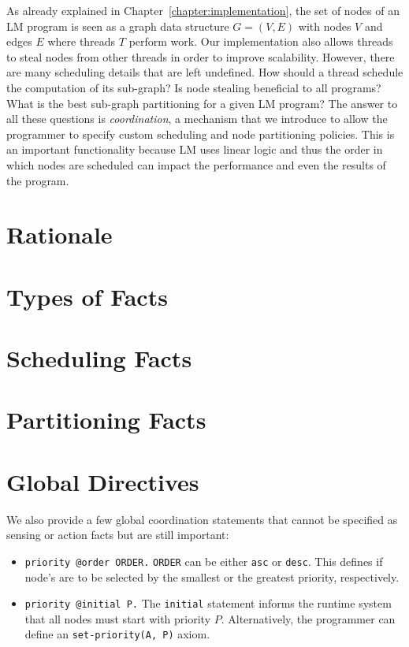 As already explained in Chapter~\ref{chapter:implementation}, the set of nodes
of an LM program is seen as a graph data structure $G = (V, E)$ with nodes $V$
and edges $E$ where threads $T$ perform work. Our implementation also allows
threads to steal nodes from other threads in order to improve scalability.
However, there are many scheduling details that are left undefined. How should a
thread schedule the computation of its sub-graph? Is node stealing beneficial to
all programs? What is the best sub-graph partitioning for a given LM program?
The answer to all these questions is \emph{coordination}, a mechanism that we
introduce to allow the programmer to specify custom scheduling and node
partitioning policies. This is an important functionality because LM uses linear
logic and thus the order in which nodes are scheduled can impact the performance
and even the results of the program.

\section{Rationale}



\section{Types of Facts}



\section{Scheduling Facts}\label{sec:fifo}



\section{Partitioning Facts}


\section{Global Directives}

We also provide a few global coordination statements that cannot be specified
as sensing or action facts but are still important:

\begin{itemize}

   \item \texttt{priority @order ORDER.} \texttt{ORDER} can be either
      \texttt{asc} or \texttt{desc}. This defines if node's are to be selected
      by the smallest or the greatest priority, respectively.

   \item \texttt{priority @initial P.} The \texttt{initial} statement informs
      the runtime system that all nodes must start with priority $P$.
      Alternatively, the programmer can define an \texttt{set-priority(A, P)}
      axiom.

\end{itemize}

